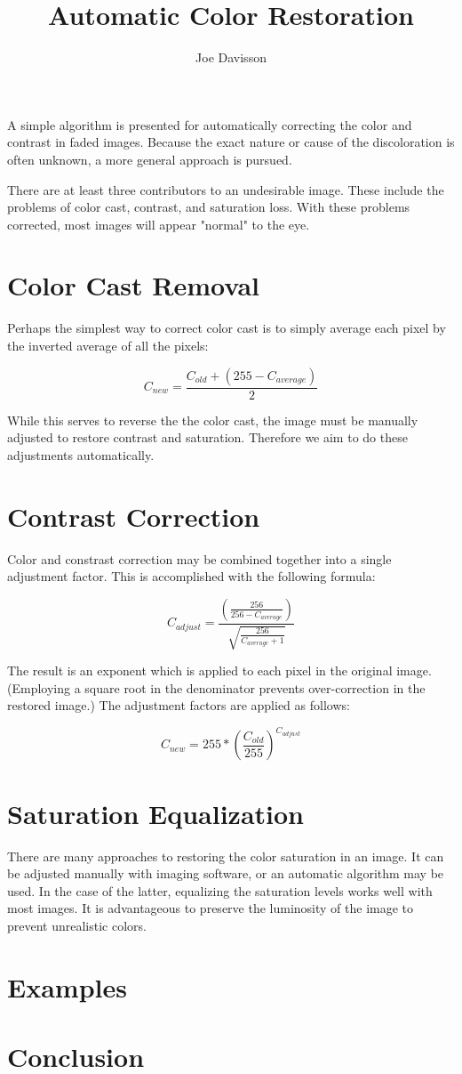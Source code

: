 \documentclass{article}
\title{Automatic Color Restoration}
\author{Joe Davisson} %
\begin{document}
\maketitle

A simple algorithm is presented for automatically correcting the
color and contrast in faded images. Because the exact nature or cause
of the discoloration is often unknown, a more general approach is pursued.

There are at least three contributors to an undesirable image. These include the problems of color cast, contrast, and saturation loss. With these problems corrected, most images will appear "normal" to the eye.

\section{Color Cast Removal}
Perhaps the simplest way to correct color cast is to simply average each
pixel by the inverted average of all the pixels:

\[ C_{new} = \frac{C_{old} + \left(255 - C_{average}\right) }{2} \]

While this serves to reverse the the color cast, the image must be manually
adjusted to restore contrast and saturation. Therefore we aim to do these
adjustments automatically.

\section{Contrast Correction}
Color and constrast correction may be combined together into a single
adjustment factor. This is accomplished with the following formula:

\[ C_{adjust} = \frac{\left(\frac{256} {256 - C_{average}}\right)}
                     {\sqrt{\frac{256} { C_{average} + 1}}} \]

The result is an exponent which is applied to each pixel in the original image.
(Employing a square root in the denominator prevents over-correction in the
restored image.) The adjustment factors are applied as follows:

\[ C_{new} = 255 * \left(\frac{C_{old}}{255}\right) ^ {C_{adjust}} \]

\section{Saturation Equalization}
There are many approaches to restoring the color saturation in an image.
It can be adjusted manually with imaging software, or an automatic algorithm
may be used. In the case of the latter, equalizing the saturation levels works
well with most images. It is advantageous to preserve the luminosity of the
image to prevent unrealistic colors.

\section{Examples}

\section{Conclusion}
\end{document}
